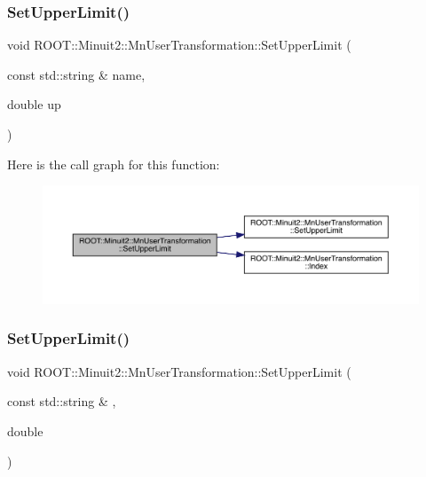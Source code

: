 \mbox{\label{classROOT_1_1Minuit2_1_1MnUserTransformation_aabe0a301a7d6f7fc322afcc4544e1129}} 
\subsubsection{\texorpdfstring{SetUpperLimit()}{SetUpperLimit()}\hspace{0.1cm}{\footnotesize\ttfamily [4/6]}}
{\footnotesize\ttfamily void R\+O\+O\+T\+::\+Minuit2\+::\+Mn\+User\+Transformation\+::\+Set\+Upper\+Limit (\begin{DoxyParamCaption}\item[{const std\+::string \&}]{name,  }\item[{double}]{up }\end{DoxyParamCaption})}

Here is the call graph for this function\+:
\nopagebreak
\begin{figure}[H]
\begin{center}
\leavevmode
\includegraphics[width=350pt]{d9/d98/classROOT_1_1Minuit2_1_1MnUserTransformation_aabe0a301a7d6f7fc322afcc4544e1129_cgraph}
\end{center}
\end{figure}
\mbox{\label{classROOT_1_1Minuit2_1_1MnUserTransformation_aabe0a301a7d6f7fc322afcc4544e1129}} 
\subsubsection{\texorpdfstring{SetUpperLimit()}{SetUpperLimit()}\hspace{0.1cm}{\footnotesize\ttfamily [5/6]}}
{\footnotesize\ttfamily void R\+O\+O\+T\+::\+Minuit2\+::\+Mn\+User\+Transformation\+::\+Set\+Upper\+Limit (\begin{DoxyParamCaption}\item[{const std\+::string \&}]{,  }\item[{double}]{ }\end{DoxyParamCaption})}

